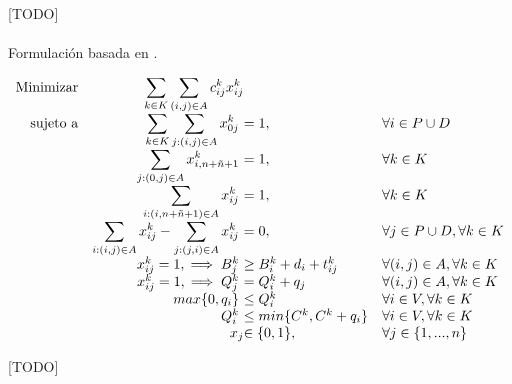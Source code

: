 \documentclass{subfiles}
\begin{document}
      \paragraph{}
      [TODO]

      \paragraph{}
       Formulación basada en \cite{cordeau2006branch}.


      \begin{eqfloat}
				\begin{equation}
					\begin{array}{rr@{}ll}
  					\text{Minimizar} & \displaystyle\sum\limits_{k \in K}\sum\limits_{(i, j) \in A}  c_{ij}^{k}x_{ij}^{k} &                 & \\
						\text{sujeto a}	 & \displaystyle\sum\limits_{k \in K}\sum\limits_{j: (i, j) \in A} x_{0j}^{k} \ &= 1,                      & \forall i \in P \cup D \\
                             & \displaystyle\sum\limits_{j: (0, j) \in A} x_{i,n+\tilde{n} + 1}^{k}  \ &= 1, 	                          & \forall k \in K \\
                             & \displaystyle\sum\limits_{i: (i, n + \tilde{n} + 1) \in A} x_{ij}^{k} \ &= 1, 	                          & \forall k \in K \\
                             & \displaystyle\sum\limits_{i: (i, j) \in A} x_{ij}^{k} - \sum\limits_{j: (j, i) \in A} x_{ij}^{k} \ &= 0, & \forall j \in P \cup D, \forall k \in K \\
                             & x_{ij}^{k} = 1, \implies B_{j}^{k} \ &\geq B_{i}^{k} + d_{i} + t_{ij}^{k} 	                          & \forall (i, j) \in A, \forall k \in K \\
                             & x_{ij}^{k} = 1, \implies Q_{j}^{k} \ &= Q_{i}^{k} + q_{j} 	                          & \forall (i, j) \in A, \forall k \in K \\
                             & max\{0, q_{i}\} \ &\leq Q_{i}^k 	                          & \forall i \in V, \forall k \in K \\
                             & Q_{i}^k \ &\leq min\{C^{k}, C^{k} + q_{i}\} 	                          & \forall i \in V, \forall k \in K \\
														 &                               	x_{j} 	&\in \{0,1\}, 	                 & \forall j \in \{1,...,n\} \\
					\end{array}
				\end{equation}
				\caption{[TODO]}
				\label{eq:basic_formulation}
			\end{eqfloat}
\end{document}
